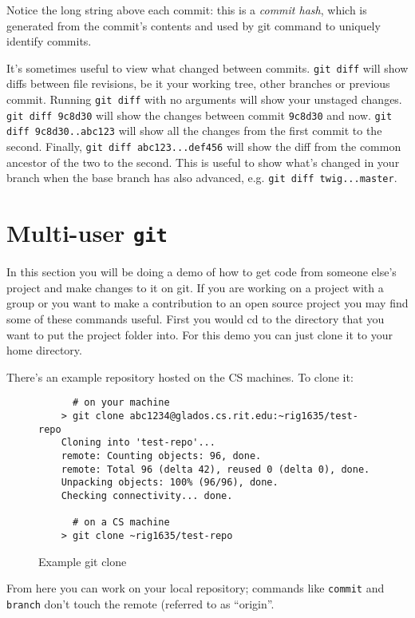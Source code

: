 \documentclass[11pt]{report}
\begin{document}
Notice the long string above each commit: this is a \emph{commit
  hash}, which is generated from the commit's contents and used by git
command to uniquely identify commits.

It's sometimes useful to view what changed between commits.
\texttt{git diff} will show diffs between file revisions, be it your
working tree, other branches or previous commit. Running \texttt{git
  diff} with no arguments will show your unstaged changes. \texttt{git
  diff 9c8d30} will show the changes between commit \texttt{9c8d30}
and now. \texttt{git diff 9c8d30..abc123} will show all the changes
from the first commit to the second. Finally, \texttt{git diff
  abc123...def456} will show the diff from the common ancestor of the
two to the second. This is useful to show what's changed in your
branch when the base branch has also advanced, e.g. \texttt{git diff
  twig...master}.

\chapter{Multi-user \texttt{git}}

In this section you will be doing a demo of how to get code from
someone else's project and make changes to it on git. If you are
working on a project with a group or you want to make a contribution
to an open source project you may find some of these commands useful.
First you would cd to the directory that you want to put the project
folder into.  For this demo you can just clone it to your home
directory.

There's an example repository hosted on the CS machines. To clone it:

\begin{figure}[H]
  \caption{Example git clone}
  \begin{lstlisting}
      # on your machine
    > git clone abc1234@glados.cs.rit.edu:~rig1635/test-repo
    Cloning into 'test-repo'...
    remote: Counting objects: 96, done.
    remote: Total 96 (delta 42), reused 0 (delta 0), done.
    Unpacking objects: 100% (96/96), done.
    Checking connectivity... done.

      # on a CS machine
    > git clone ~rig1635/test-repo
  \end{lstlisting}
\end{figure}

From here you can work on your local repository; commands like
\texttt{commit} and \texttt{branch} don't touch the remote (referred
to as ``origin''.
\end{document}
